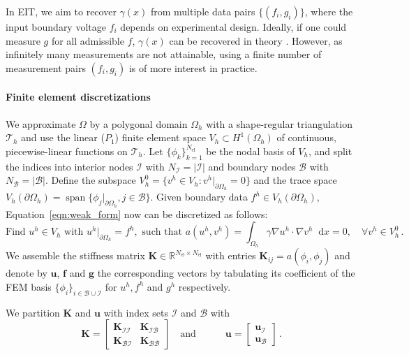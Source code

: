 \documentclass{article}
\def\Eqref#1{Equation~\ref{#1}}
\newcommand*\diff{\mathop{}\mathrm{d}}
\begin{document}
In EIT, we aim to recover $\gamma(x)$ from multiple data pairs $\{(f_i,g_i)\}$, where the input boundary voltage $f_i$ depends on experimental design. Ideally, if one could measure $g$ for all admissible $f$, $\gamma(x)$ can be recovered in theory \citep{uhlmann2009electrical,isakov2006inverse, astala2006calderon}. However, as infinitely many measurements are not attainable, using a finite number of measurement pairs $(f_i,g_i)$ is of more interest in practice. 


\paragraph{Finite element discretizations} 
We approximate $\Omega$ by a polygonal domain $\Omega_h$ with a shape-regular triangulation $\mathcal T_h$ and use the linear ($P_1$) finite element space $V_h\subset H^1(\Omega_h)$ of continuous, piecewise-linear functions on $\mathcal T_h$. Let $\{\phi_k\}_{k=1}^{N_{\text{el}}}$ be the nodal basis of $V_h$, and split the indices into interior nodes $\mathcal{I}$ with $N_{\mathcal{I}}=|\mathcal{I}|$ and boundary nodes $\mathcal{B}$ with $N_{\mathcal{B}}=|\mathcal{B}|$. Define the subspace $V_h^0 = \{v^h \in V_h: v^h |_{\partial\Omega_h}=0 \}$ and the trace space $V_h(\partial \Omega_h) = \operatorname{span}\{\phi_j |_{\partial\Omega_h}, j \in \mathcal{B}\}$.
Given boundary data $f^h \in V_h(\partial \Omega_h)$, \Eqref{eqn:weak_form} now can be discretized as follows:
\[
  \text{Find } u^h \in V_h \text{ with } u^h|_{\partial \Omega_h}=f^h,  \text{ such that }a(u^h, v^h) = \int_{\Omega_h} \gamma \nabla u^h \cdot \nabla v^h \diff x=0, \quad \forall v^h \in V_h^0\,.
\]
We assemble the stiffness matrix $\mathbf{K} \in \mathbb{R}^{N_{\text{el}} \times N_{\text{el}}}$ with entries $\mathbf{K}_{ij}=a(\phi_i, \phi_j)$ and denote by $\mathbf{u}$, $\mathbf{f}$ and $\mathbf{g}$ the corresponding vectors by tabulating its coefficient of the FEM basis $\{\phi_i\}_{i \in \mathcal{B} \cup \mathcal{I}}$ for $u^h, f^h$ and $g^h$ respectively.

We partition $\mathbf{K}$ and $\mathbf{u}$ with index sets $\mathcal{I}$ and $\mathcal{B}$ with
\begin{equation*}
\mathbf{K}=
\begin{bmatrix}
    \mathbf{K}_{\mathcal{I}\mathcal{I}} & \mathbf{K}_{\mathcal{I}\mathcal{B}} \\
    \mathbf{K}_{\mathcal{BI}} & \mathbf{K}_{\mathcal{BB}}
\end{bmatrix} \quad \text{and} \quad \qquad\mathbf{u} = \begin{bmatrix}
    \mathbf{u_{\mathcal{I}}}\\ \mathbf{u}_{\mathcal{B}}
\end{bmatrix} \,.
\end{equation*}
\end{document}
